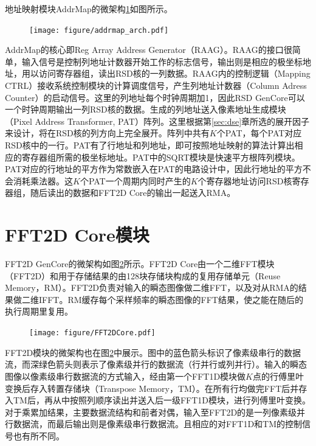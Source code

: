\documentclass[master]{shtthesis}             %
\begin{document}
地址映射模块{AddrMap}的微架构\ref{fig:addrmap_arch}如图所示。
\begin{figure}[!tb]
  \centering
  \texttt{[image: figure/addrmap\_arch.pdf]}
  \label{fig:addrmap_arch}
\end{figure}
{AddrMap}的核心即{Reg Array Address Generator}（RAAG）。RAAG的接口很简单，输入信号是控制列地址计数器开始工作的标志信号，输出则是相应的极坐标地址，用以访问寄存器组，读出RSD核的一列数据。RAAG内的控制逻辑（Mapping CTRL）接收系统控制模块的计算调度信号，产生列地址计数器（Column Adress Counter）的启动信号。这里的列地址每个时钟周期加1，因此RSD GenCore可以一个时钟周期输出一列RSD核的数据。生成的列地址送入像素地址生成模块（Pixel Address Transformer, PAT）阵列。这里根据第\ref{sec:dse}章所选的展开因子来设计，将在RSD核的列方向上完全展开。阵列中共有$K$个PAT，每个PAT对应RSD核中的一行。PAT有了行地址和列地址，即可按照地址映射的算法计算出相应的寄存器组所需的极坐标地址。PAT中的SQRT模块是快速平方根阵列模块。PAT对应的行地址的平方作为常数嵌入在PAT的电路设计中，因此行地址的平方不会消耗乘法器。这$K$个PAT一个周期内同时产生的$K$个寄存器地址访问RSD核寄存器组，随后读出的数据和FFT2D Core的输出一起送入RMA。

\section{FFT2D Core模块}\label{sec:fft2dcore}

FFT2D GenCore的微架构如图\ref{fig:fft2d_core_uarch}所示。FFT2D Core由一个二维FFT模块（FFT2D）和用于存储结果的由128块存储块构成的复用存储单元（Reuse Memory，RM）。FFT2D负责对输入的瞬态图像做二维FFT，以及对从RMA的结果做二维IFFT。RM缓存每个采样频率的瞬态图像的FFT结果，使之能在随后的执行周期里复用。%
\begin{figure}[!tb]
  \centering
  \texttt{[image: figure/FFT2DCore.pdf]}
  \label{fig:fft2d_core_uarch}
\end{figure}
FFT2D模块的微架构也在图\ref{fig:fft2d_core_uarch}中展示。图中的蓝色箭头标识了像素级串行的数据流，而深绿色箭头则表示了像素级并行的数据流（行并行或列并行）。输入的瞬态图像以像素级串行数据流的方式输入，经由第一个FFT1D模块做$K$点的行傅里叶变换后存入转置存储块（Transpose Memory，TM）。在所有行均做完FFT后并存入TM后，再从中按照列顺序读出并送入后一级FFT1D模块，进行列傅里叶变换。对于乘累加结果，主要数据流结构和前者对偶，输入至FFT2D的是一列像素级并行数据流，而最后输出则是像素级串行数据流。且相应的对FFT1D和TM的控制信号也有所不同。
\end{document}
